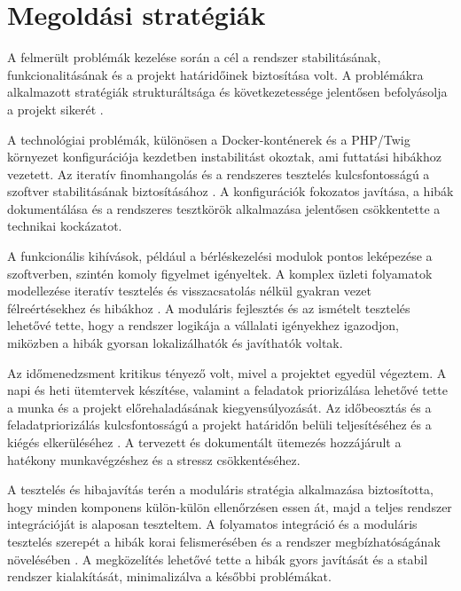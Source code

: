 \section{Megoldási stratégiák}

A felmerült problémák kezelése során a cél a rendszer stabilitásának, funkcionalitásának és a projekt határidőinek biztosítása volt. 
A problémákra alkalmazott stratégiák strukturáltsága és 
következetessége jelentősen befolyásolja a projekt sikerét \cite{Hajdu2014,Szalay2018,Kaposi2019}.

A technológiai problémák, különösen a Docker-konténerek és a PHP/Twig környezet konfigurációja 
kezdetben instabilitást okoztak, ami futtatási hibákhoz vezetett. Az iteratív 
finomhangolás és a rendszeres tesztelés kulcsfontosságú a szoftver stabilitásának biztosításához \cite{Kovacs2016}. 
A konfigurációk fokozatos javítása, a hibák dokumentálása és a rendszeres tesztkörök alkalmazása jelentősen csökkentette a technikai kockázatot.

A funkcionális kihívások, például a bérléskezelési modulok pontos leképezése a szoftverben, szintén komoly figyelmet igényeltek. 
A komplex üzleti folyamatok modellezése iteratív tesztelés és 
visszacsatolás nélkül gyakran vezet félreértésekhez és hibákhoz \cite{Szalay2018,Kaposi2019}. 
A moduláris fejlesztés és az ismételt tesztelés lehetővé tette, hogy 
a rendszer logikája a vállalati igényekhez igazodjon, miközben a hibák gyorsan lokalizálhatók és javíthatók voltak.

Az időmenedzsment kritikus tényező volt, mivel a projektet egyedül végeztem. 
A napi és heti ütemtervek készítése, valamint a feladatok priorizálása lehetővé tette a munka és a projekt előrehaladásának kiegyensúlyozását. 
Az időbeosztás és a feladatpriorizálás kulcsfontosságú a 
projekt határidőn belüli teljesítéséhez és a kiégés elkerüléséhez \cite{Kovacs2016,Hajdu2014}. 
A tervezett és dokumentált ütemezés hozzájárult a hatékony munkavégzéshez és a stressz csökkentéséhez.

A tesztelés és hibajavítás terén a moduláris stratégia alkalmazása biztosította, 
hogy minden komponens külön-külön ellenőrzésen essen át, majd a teljes rendszer integrációját is alaposan teszteltem. 
A folyamatos integráció és a moduláris tesztelés szerepét 
a hibák korai felismerésében és a rendszer megbízhatóságának növelésében \cite{Szalay2018,Kaposi2019}. 
A megközelítés lehetővé tette a hibák gyors javítását és a stabil rendszer kialakítását, minimalizálva a későbbi problémákat.

